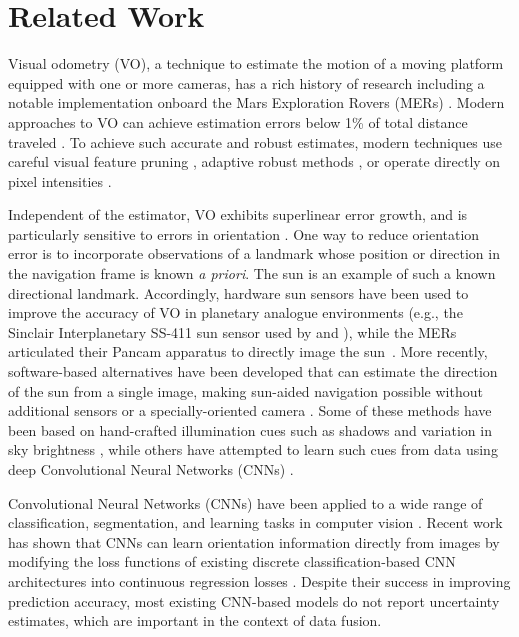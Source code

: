 \section{Related Work}

Visual odometry (VO), a technique to estimate the motion of a moving platform equipped with one or more cameras, has a rich history of research including a notable implementation onboard the Mars Exploration Rovers (MERs) \citep{Scaramuzza2011-qr}. 
Modern approaches to VO can achieve estimation errors below 1\% of total distance traveled  \citep{Geiger2013-ky}. 
To achieve such accurate and robust estimates, modern techniques use careful visual feature pruning \citep{Cvisic2015-mt}, adaptive robust methods  \citep{Alcantarilla2016-fs,Peretroukhin2016-om}, or operate directly on pixel intensities \citep{Engel2015-il}.

Independent of the estimator, VO exhibits superlinear error growth, and is particularly sensitive to errors in orientation \citep{Olson2003-ax, Cvisic2015-mt}. 
One way to reduce orientation error is to incorporate observations of a landmark whose position or direction in the navigation frame is known \emph{a priori}. 
The sun is an example of such a known directional landmark. 
Accordingly, hardware sun sensors have been used to improve the accuracy of VO in planetary analogue environments (e.g., the Sinclair Interplanetary SS-411 sun sensor used by \citet{Furgale2011-zu} and \citet{Lambert2012-um}), while the MERs articulated their Pancam apparatus to directly image the sun~\citep{Maimone2007-tc,Eisenman2002-cg}. 
More recently, software-based alternatives have been developed that can estimate the direction of the sun from a single image, making sun-aided navigation possible without additional sensors or a specially-oriented camera \citep{Clement2016-ir}. 
Some of these methods have been based on hand-crafted illumination cues such as shadows and variation in sky brightness \citep{Lalonde2011-jw,Clement2016-ir}, while others have attempted to learn such cues from data using deep Convolutional Neural Networks (CNNs) \citep{Ma2016-at}.

Convolutional Neural Networks (CNNs) have been applied to a wide range of classification, segmentation, and learning tasks in computer vision \citep{LeCun2015-qf}. 
Recent work has shown that CNNs can learn orientation information directly from images by modifying the loss functions of existing discrete classification-based CNN architectures into continuous regression losses \citep{Ma2016-at, kendall2015posenet, Kendall2016-zf}. 
Despite their success in improving prediction accuracy, most existing CNN-based models do not report uncertainty estimates, which are important in the context of data fusion.

